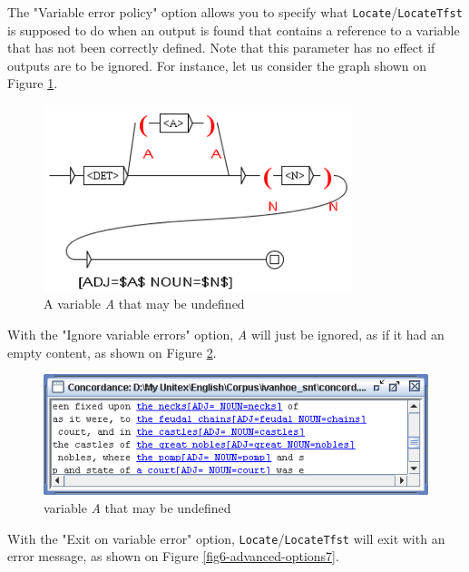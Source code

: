 \bigskip
{}
\noindent The "Variable error policy" option allows you to specify what
\verb+Locate+/\verb+LocateTfst+ is supposed to do when an output is found that
contains a reference to a variable that has not been correctly defined. Note
that this parameter has no effect if outputs are to be ignored. 
For instance, let us consider the graph shown on Figure
\ref{fig6-advanced-options5}. 

\bigskip
\begin{figure}[!h]
\begin{center}
\includegraphics[width=9cm]{resources/img/fig6-advanced-options5.png}
\caption{A variable \textit{A} that may be
undefined\label{fig6-advanced-options5}}
\end{center}
\end{figure}

\noindent With the "Ignore variable errors" option, \textit{A} will just be
ignored, as if it had an empty content, as shown on Figure
\ref{fig6-advanced-options6}. 

\bigskip
\begin{figure}[!h]
\begin{center}
\includegraphics[width=12cm]{resources/img/fig6-advanced-options6.png}
\caption{
 variable \textit{A} that may be
undefined\label{fig6-advanced-options6}}
\end{center}
\end{figure}


\noindent With the "Exit on variable error" option, \verb+Locate+/\verb+LocateTfst+
will exit with an error message, as shown on Figure
\ref{fig6-advanced-options7}.

